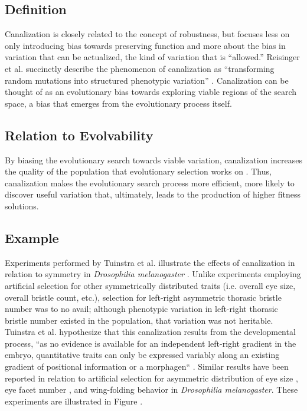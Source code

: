 \subsection{Definition}
Canalization is closely related to the concept of robustness, but focuses less on only introducing bias towards preserving function and more about the bias in variation that can be actualized, the kind of variation that is ``allowed.'' Reisinger et al. succinctly describe the phenomenon of canalization as ``transforming random mutations into structured phenotypic variation'' \cite{Reisinger2007AcquiringRepresentations}. Canalization can be thought of as an evolutionary bias towards exploring viable regions of the search space, a bias that emerges from the evolutionary process itself.

\subsection{Relation to Evolvability}
By biasing the evolutionary search towards viable variation, canalization increases the quality of the population that evolutionary selection works on \cite[p 40]{Downing2015IntelligenceSystems}.\mindmapmark{\usefulvariationcanalization} Thus, canalization makes the evolutionary search process more efficient, more likely to discover useful variation that, ultimately, leads to the production of higher fitness solutions.

\subsection{Example} \label{sec:fly_symmetry}
Experiments performed by Tuinstra et al. illustrate the effects of canalization in relation to symmetry in \textit{Drosophilia melanogaster} \cite{Tuinstra1990LackDevelopment}. Unlike experiments employing artificial selection for other symmetrically distributed traits (i.e. overall eye size, overall bristle count, etc.), selection for left-right asymmetric thorasic bristle number was to no avail; although phenotypic variation in left-right thorasic bristle number existed in the population, that variation was not heritable. Tuinstra et al. hypothesize that this canalization results from the developmental process, ``as no evidence is available for an independent left-right gradient in the embryo, quantitative traits can only be expressed variably along an existing gradient of positional information or a morphagen`` \cite{Tuinstra1990LackDevelopment}. Similar results have been reported in relation to artificial selection for asymmetric distribution of eye size \cite{Coyne1987LackMelanogaster}, eye facet number \cite{ManyardSmith1960ThePattern}, and wing-folding behavior \cite{Purnell1973SelectionMelanogaster} in \textit{Drosophilia melanogaster}. These experiments are illustrated in Figure .


